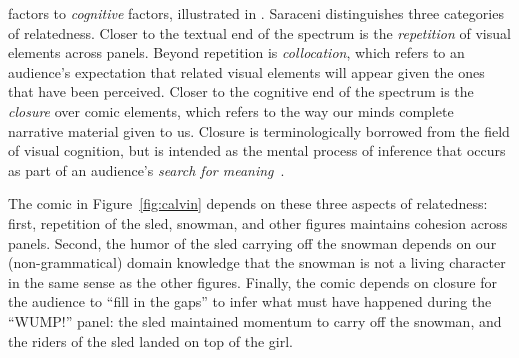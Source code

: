factors to \emph{cognitive} factors, illustrated in .
%
Saraceni distinguishes three categories of relatedness.
Closer to the textual end of the spectrum is the \emph{repetition} of visual
elements across panels. Beyond repetition is \emph{collocation}, which refers
to an audience's expectation that related visual elements will appear given the
ones that have been perceived. Closer to the cognitive end of the spectrum is
the \emph{closure} over comic elements, which refers to the way our minds 
complete narrative material given to us. Closure is terminologically borrowed 
from the field of visual cognition, but is intended as the mental process 
of inference that occurs as part of an audience's 
\emph{search for meaning}~\cite{gerrig1994readers}.

%
The comic in Figure~\ref{fig:calvin} depends on these three 
aspects of relatedness: first, repetition of the sled, snowman, and other
figures maintains cohesion across panels. Second, the humor of the sled
carrying off the snowman depends on our (non-grammatical) domain knowledge
that the snowman is not a living character in the same sense as the other
figures. Finally, the comic depends on closure for the audience to ``fill
in the gaps'' to infer what must have happened during the ``WUMP!'' panel:
the sled maintained momentum to carry off the snowman, and the riders of
the sled landed on top of the girl.

